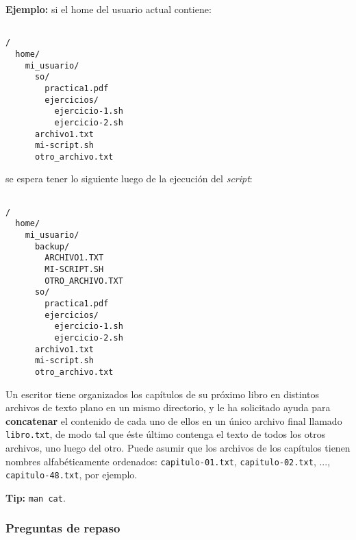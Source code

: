 \begin{questions}
  \textbf{Ejemplo:} si el home del usuario actual contiene:

  \begin{lstlisting}

/
  home/
    mi_usuario/
      so/
        practica1.pdf
        ejercicios/
          ejercicio-1.sh
          ejercicio-2.sh
      archivo1.txt
      mi-script.sh
      otro_archivo.txt

  \end{lstlisting}

se espera tener lo siguiente luego de la ejecución del \textit{script}:

\begin{lstlisting}

/
  home/
    mi_usuario/
      backup/
        ARCHIVO1.TXT
        MI-SCRIPT.SH
        OTRO_ARCHIVO.TXT
      so/
        practica1.pdf
        ejercicios/
          ejercicio-1.sh
          ejercicio-2.sh
      archivo1.txt
      mi-script.sh
      otro_archivo.txt

\end{lstlisting}

\question Un escritor tiene organizados los capítulos de su próximo libro en distintos archivos
  de texto plano en un mismo directorio, y le ha solicitado ayuda para \textbf{concatenar}
  el contenido de cada uno de ellos en un único archivo final llamado \texttt{libro.txt},
  de modo tal que éste último contenga el texto de todos los otros archivos, uno luego del otro.
  Puede asumir que los archivos de los capítulos tienen nombres alfabéticamente ordenados:
  \texttt{capitulo-01.txt}, \texttt{capitulo-02.txt}, ..., \texttt{capitulo-48.txt}, por ejemplo.

  \textbf{Tip:} \texttt{man cat}.

\end{questions}

\subsubsection{Preguntas de repaso}

